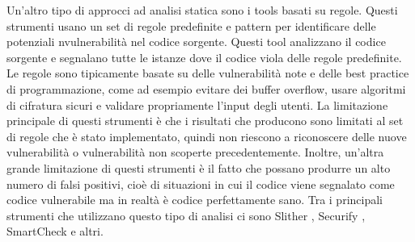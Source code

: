 \documentclass[../../Thesis.tex]{subfiles}
\begin{document}
Un'altro tipo di approcci ad analisi statica sono i tools basati su regole. Questi strumenti usano un set di regole predefinite e pattern per identificare delle potenziali nvulnerabilità nel codice sorgente. Questi tool analizzano il codice sorgente e segnalano tutte le istanze dove il codice viola delle regole predefinite. Le regole sono tipicamente basate su delle vulnerabilità note e delle best practice di programmazione, come ad esempio evitare dei buffer overflow, usare algoritmi di cifratura sicuri e validare propriamente l'input degli utenti. La limitazione principale di questi strumenti è che i risultati che producono sono limitati al set di regole che è stato implementato, quindi non riescono a riconoscere delle nuove vulnerabilità o vulnerabilità non scoperte precedentemente. Inoltre, un'altra grande limitazione di questi strumenti è il fatto che possano produrre un alto numero di falsi positivi, cioè di situazioni in cui il codice viene segnalato come codice vulnerabile ma in realtà è codice perfettamente sano. Tra i principali strumenti che utilizzano questo tipo di analisi ci sono Slither \cite{Slither}, Securify \cite{Securify}, SmartCheck \cite{SmartCheck} e altri.
\end{document}
